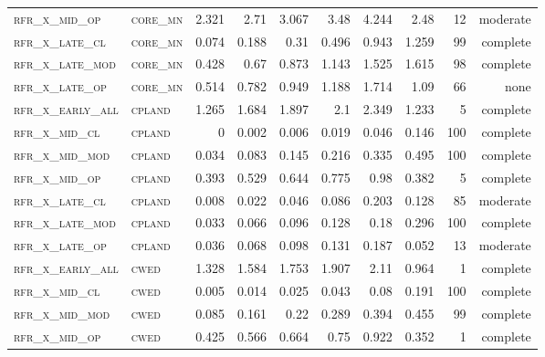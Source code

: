\begin{landscape}
\begin{center}
\begin{footnotesize}
\begin{longtable}{llrrrrr|rrr}
\textsc{rfr\_x\_mid\_op   } & \textsc{core\_mn  }   & 2.321   & 2.71    & 3.067    & 3.48     & 4.244    & 2.48    & 12  & moderate \\
\textsc{rfr\_x\_late\_cl  } & \textsc{core\_mn  }   & 0.074   & 0.188   & 0.31     & 0.496    & 0.943    & 1.259   & 99  & complete \\
\textsc{rfr\_x\_late\_mod } & \textsc{core\_mn  }   & 0.428   & 0.67    & 0.873    & 1.143    & 1.525    & 1.615   & 98  & complete \\
\textsc{rfr\_x\_late\_op  } & \textsc{core\_mn  }   & 0.514   & 0.782   & 0.949    & 1.188    & 1.714    & 1.09    & 66  & none     \\
\textsc{rfr\_x\_early\_all} & \textsc{cpland    }   & 1.265   & 1.684   & 1.897    & 2.1      & 2.349    & 1.233   & 5   & complete \\
\textsc{rfr\_x\_mid\_cl   } & \textsc{cpland    }   & 0       & 0.002   & 0.006    & 0.019    & 0.046    & 0.146   & 100 & complete \\
\textsc{rfr\_x\_mid\_mod  } & \textsc{cpland    }   & 0.034   & 0.083   & 0.145    & 0.216    & 0.335    & 0.495   & 100 & complete \\
\textsc{rfr\_x\_mid\_op   } & \textsc{cpland    }   & 0.393   & 0.529   & 0.644    & 0.775    & 0.98     & 0.382   & 5   & complete \\
\textsc{rfr\_x\_late\_cl  } & \textsc{cpland    }   & 0.008   & 0.022   & 0.046    & 0.086    & 0.203    & 0.128   & 85  & moderate \\
\textsc{rfr\_x\_late\_mod } & \textsc{cpland    }   & 0.033   & 0.066   & 0.096    & 0.128    & 0.18     & 0.296   & 100 & complete \\
\textsc{rfr\_x\_late\_op  } & \textsc{cpland    }   & 0.036   & 0.068   & 0.098    & 0.131    & 0.187    & 0.052   & 13  & moderate \\
\textsc{rfr\_x\_early\_all} & \textsc{cwed      }   & 1.328   & 1.584   & 1.753    & 1.907    & 2.11     & 0.964   & 1   & complete \\
\textsc{rfr\_x\_mid\_cl   } & \textsc{cwed      }   & 0.005   & 0.014   & 0.025    & 0.043    & 0.08     & 0.191   & 100 & complete \\
\textsc{rfr\_x\_mid\_mod  } & \textsc{cwed      }   & 0.085   & 0.161   & 0.22     & 0.289    & 0.394    & 0.455   & 99  & complete \\
\textsc{rfr\_x\_mid\_op   } & \textsc{cwed      }   & 0.425   & 0.566   & 0.664    & 0.75     & 0.922    & 0.352   & 1   & complete \\

\end{longtable}
\end{footnotesize}
\end{center}
\end{landscape}
